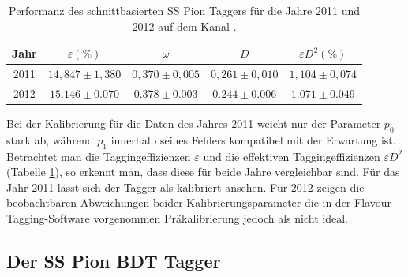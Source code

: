 \begin{table}[htbp]
	\centering
	\caption{Performanz des schnittbasierten SS Pion Taggers für die Jahre \num{2011} und \num{2012} auf dem Kanal \BdToDpi.}
	\label{tab:performance_SSPion}
	\begin{tabular}{ccccc}
	\toprule
       Jahr & $\varepsilon(\%)$ & $\omega$ & $D$ & $\varepsilon D^2(\%)$ \\ 
       \midrule
   2011 & $14{,}847\pm1{,}380$& $0{,}370\pm0{,}005$ & $0{,}261\pm0{,}010$ & $1{,}104\pm0{,}074$\\ 
   2012 & $15{.}146\pm0{.}070$ & $0{.}378\pm0{.}003$ & $0{.}244\pm0{.}006$ & $1{.}071\pm0{.}049$\\ 
   \bottomrule
	\end{tabular}
\end{table}
Bei der Kalibrierung für die Daten des Jahres \num{2011} weicht nur der Parameter $p_0$ stark ab, während $p_1$ innerhalb seines Fehlers kompatibel mit der Erwartung ist. \\
Betrachtet man die Taggingeffizienzen $\varepsilon$ und die effektiven Taggingeffizienzen $\varepsilon D^2$ (Tabelle \ref{tab:performance_SSPion}), so erkennt man, dass diese für beide Jahre vergleichbar sind. Für das Jahr \num{2011} lässt sich der Tagger als kalibriert ansehen. Für \num{2012}  zeigen die beobachtbaren Abweichungen beider Kalibrierungsparameter die in der Flavour-Tagging-Software vorgenommen Präkalibrierung jedoch als nicht ideal.  

\subsection{Der SS Pion BDT Tagger}

